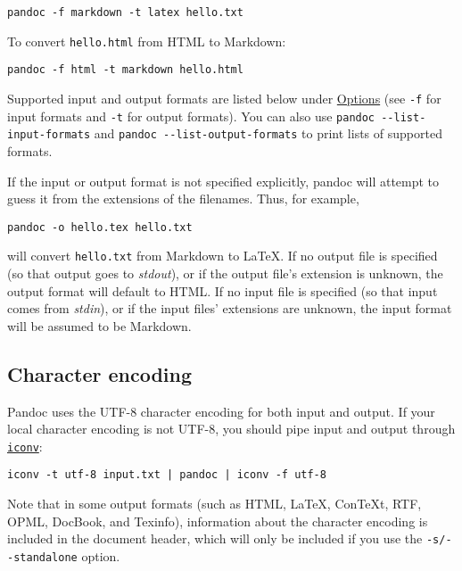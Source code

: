 \documentclass[
  a4paper,
]{article}
\begin{document}
\begin{verbatim}
pandoc -f markdown -t latex hello.txt
\end{verbatim}

To convert \texttt{hello.html} from HTML to Markdown:

\begin{verbatim}
pandoc -f html -t markdown hello.html
\end{verbatim}

Supported input and output formats are listed below under
\protect\hyperlink{options}{Options} (see \texttt{-f} for input formats
and \texttt{-t} for output formats). You can also use
\texttt{pandoc\ -\/-list-input-formats} and
\texttt{pandoc\ -\/-list-output-formats} to print lists of supported
formats.

If the input or output format is not specified explicitly, pandoc will
attempt to guess it from the extensions of the filenames. Thus, for
example,

\begin{verbatim}
pandoc -o hello.tex hello.txt
\end{verbatim}

will convert \texttt{hello.txt} from Markdown to LaTeX. If no output
file is specified (so that output goes to \emph{stdout}), or if the
output file's extension is unknown, the output format will default to
HTML. If no input file is specified (so that input comes from
\emph{stdin}), or if the input files' extensions are unknown, the input
format will be assumed to be Markdown.

\hypertarget{character-encoding}{%
\subsection{Character encoding}\label{character-encoding}}

Pandoc uses the UTF-8 character encoding for both input and output. If
your local character encoding is not UTF-8, you should pipe input and
output through
\href{https://www.gnu.org/software/libiconv/}{\texttt{iconv}}:

\begin{verbatim}
iconv -t utf-8 input.txt | pandoc | iconv -f utf-8
\end{verbatim}

Note that in some output formats (such as HTML, LaTeX, ConTeXt, RTF,
OPML, DocBook, and Texinfo), information about the character encoding is
included in the document header, which will only be included if you use
the \texttt{-s/-\/-standalone} option.
\end{document}
